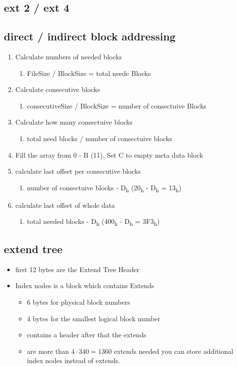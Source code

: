 \documentclass[11pt,twoside,landscape]{article}
\begin{document}
\begin{multicols}{3}
\section*{ext 2 / ext 4}
\label{sec:org322dc45}
\subsection*{direct / indirect block addressing}
\label{sec:orgfbd070e}
\begin{enumerate}
\item Calculate numbers of needed blocks
\begin{enumerate}
\item FileSize / BlockSize = total neede Blocks
\end{enumerate}
\item Calculate consecutive blocks
\begin{enumerate}
\item consecutiveSize / BlockSize = number of consectuive Blocks
\end{enumerate}
\item Calculate how many consectuive blocks
\begin{enumerate}
\item total need blocks / number of consectuive blocks
\end{enumerate}
\item Fill the array from 0 - B (11). Set C to empty meta data block
\item calculate last offset per consecutive blocks
\begin{enumerate}
\item number of consectuive blocks - D\textsubscript{h} (20\textsubscript{h} - D\textsubscript{h} = 13\textsubscript{h})
\end{enumerate}
\item calculate last offset of whole data
\begin{enumerate}
\item total needed blocks - D\textsubscript{h} (400\textsubscript{h} - D\textsubscript{h} = 3F3\textsubscript{h})
\end{enumerate}
\end{enumerate}


\subsection*{extend tree}
\label{sec:orgded06a9}
\begin{itemize}
\item first 12 bytes are the Extend Tree Header
\item Index nodes is a block which contains Extends
\begin{itemize}
\item 6 bytes for physical block numbers
\item 4 bytes for the smallest logical block number
\item contains a header after that the extends
\item are more than \(4 \cdot 340 = 1360\) extends needed you can store additional index nodes instead of extends.
\end{itemize}
\end{itemize}

\end{multicols}
\end{document}
